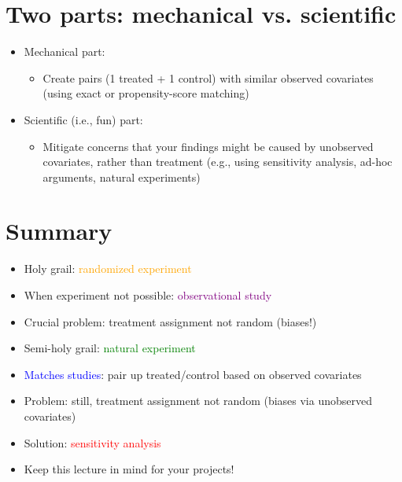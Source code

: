 \documentclass[11pt]{article}
\begin{document}
\section*{Two parts: mechanical vs. scientific}
\begin{itemize}
	\item Mechanical part:
		\begin{itemize}
			\item Create pairs (1 treated + 1 control) with similar observed covariates (using exact or propensity-score matching)
		\end{itemize}
	\item Scientific (i.e., fun) part:
		\begin{itemize}
			\item Mitigate concerns that your findings might be caused by unobserved covariates, rather than treatment (e.g., using sensitivity analysis, ad-hoc arguments, natural experiments)
		\end{itemize}
\end{itemize}

\section*{Summary}
\begin{itemize}
	\item Holy grail: \textcolor{orange}{randomized experiment}
	\item When experiment not possible: \textcolor{purple}{observational study}
	\item Crucial problem: treatment assignment not random (biases!)
	\item Semi-holy grail: \textcolor{green}{natural experiment}
	\item \textcolor{blue}{Matches studies}: pair up treated/control based on observed covariates
	\item Problem: still, treatment assignment not random (biases via unobserved covariates)
	\item Solution: \textcolor{red}{sensitivity analysis}
	\item Keep this lecture in mind for your projects!
\end{itemize}
\end{document}
